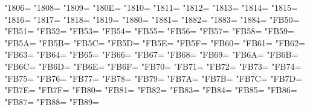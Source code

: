 \XeTeXcharclass"1806=\KclassArabU
\XeTeXcharclass"1808=\KclassArabU
\XeTeXcharclass"1809=\KclassArabU
\XeTeXcharclass"180E=\KclassArabU
\XeTeXcharclass"1810=\KclassArabU
\XeTeXcharclass"1811=\KclassArabU
\XeTeXcharclass"1812=\KclassArabU
\XeTeXcharclass"1813=\KclassArabU
\XeTeXcharclass"1814=\KclassArabU
\XeTeXcharclass"1815=\KclassArabU
\XeTeXcharclass"1816=\KclassArabU
\XeTeXcharclass"1817=\KclassArabU
\XeTeXcharclass"1818=\KclassArabU
\XeTeXcharclass"1819=\KclassArabU
\XeTeXcharclass"1880=\KclassArabU
\XeTeXcharclass"1881=\KclassArabU
\XeTeXcharclass"1882=\KclassArabU
\XeTeXcharclass"1883=\KclassArabU
\XeTeXcharclass"1884=\KclassArabU
\XeTeXcharclass"FB50=\KclassArabU
\XeTeXcharclass"FB51=\KclassArabU
\XeTeXcharclass"FB52=\KclassArabU
\XeTeXcharclass"FB53=\KclassArabU
\XeTeXcharclass"FB54=\KclassArabU
\XeTeXcharclass"FB55=\KclassArabU
\XeTeXcharclass"FB56=\KclassArabU
\XeTeXcharclass"FB57=\KclassArabU
\XeTeXcharclass"FB58=\KclassArabU
\XeTeXcharclass"FB59=\KclassArabU
\XeTeXcharclass"FB5A=\KclassArabU
\XeTeXcharclass"FB5B=\KclassArabU
\XeTeXcharclass"FB5C=\KclassArabU
\XeTeXcharclass"FB5D=\KclassArabU
\XeTeXcharclass"FB5E=\KclassArabU
\XeTeXcharclass"FB5F=\KclassArabU
\XeTeXcharclass"FB60=\KclassArabU
\XeTeXcharclass"FB61=\KclassArabU
\XeTeXcharclass"FB62=\KclassArabU
\XeTeXcharclass"FB63=\KclassArabU
\XeTeXcharclass"FB64=\KclassArabU
\XeTeXcharclass"FB65=\KclassArabU
\XeTeXcharclass"FB66=\KclassArabU
\XeTeXcharclass"FB67=\KclassArabU
\XeTeXcharclass"FB68=\KclassArabU
\XeTeXcharclass"FB69=\KclassArabU
\XeTeXcharclass"FB6A=\KclassArabU
\XeTeXcharclass"FB6B=\KclassArabU
\XeTeXcharclass"FB6C=\KclassArabU
\XeTeXcharclass"FB6D=\KclassArabU
\XeTeXcharclass"FB6E=\KclassArabU
\XeTeXcharclass"FB6F=\KclassArabU
\XeTeXcharclass"FB70=\KclassArabU
\XeTeXcharclass"FB71=\KclassArabU
\XeTeXcharclass"FB72=\KclassArabU
\XeTeXcharclass"FB73=\KclassArabU
\XeTeXcharclass"FB74=\KclassArabU
\XeTeXcharclass"FB75=\KclassArabU
\XeTeXcharclass"FB76=\KclassArabU
\XeTeXcharclass"FB77=\KclassArabU
\XeTeXcharclass"FB78=\KclassArabU
\XeTeXcharclass"FB79=\KclassArabU
\XeTeXcharclass"FB7A=\KclassArabU
\XeTeXcharclass"FB7B=\KclassArabU
\XeTeXcharclass"FB7C=\KclassArabU
\XeTeXcharclass"FB7D=\KclassArabU
\XeTeXcharclass"FB7E=\KclassArabU
\XeTeXcharclass"FB7F=\KclassArabU
\XeTeXcharclass"FB80=\KclassArabU
\XeTeXcharclass"FB81=\KclassArabU
\XeTeXcharclass"FB82=\KclassArabU
\XeTeXcharclass"FB83=\KclassArabU
\XeTeXcharclass"FB84=\KclassArabU
\XeTeXcharclass"FB85=\KclassArabU
\XeTeXcharclass"FB86=\KclassArabU
\XeTeXcharclass"FB87=\KclassArabU
\XeTeXcharclass"FB88=\KclassArabU
\XeTeXcharclass"FB89=\KclassArabU
